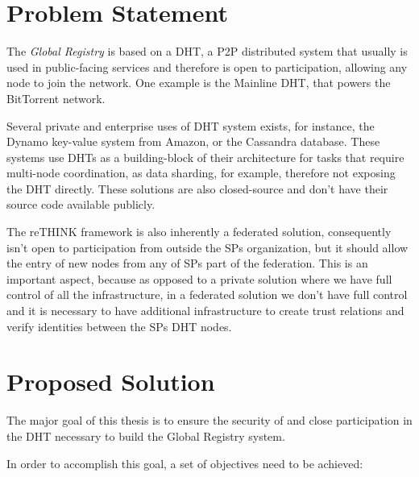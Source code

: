 \section{Problem Statement}
\label{section:problem-statement}

The \textit{Global Registry} is based on a \ac{DHT}, a \ac{P2P} distributed system  that usually is used in public-facing services and therefore is open to participation, allowing any node to join the network.
One example is the Mainline \ac{DHT}, that powers the BitTorrent network.

Several private and enterprise uses of DHT system exists, for instance, the Dynamo\cite{dynamo2007} key-value system from Amazon, or the Cassandra\cite{cassandra2010} database.
These systems use \acp{DHT} as a building-block of their architecture for tasks that require multi-node coordination, as data sharding, for example, therefore not exposing the \ac{DHT} directly.
These solutions are also closed-source and don't have their source code available publicly.

The reTHINK framework is also inherently a federated solution, consequently isn't open to participation from outside the \acp{SP} organization, but it should allow the entry of new nodes from any of \acp{SP} part of the federation.
This is an important aspect, because as opposed to a private solution where we have full control of all the infrastructure, in a federated solution we don't have full control and it is necessary to have additional infrastructure to create trust relations and verify identities between the \acp{SP} \ac{DHT} nodes.

\section{Proposed Solution}
\label{section:proposed}

The major goal of this thesis is to ensure the security of and close participation in the \ac{DHT} necessary to build the Global Registry system.

In order to accomplish this goal, a set of objectives need to be achieved:

